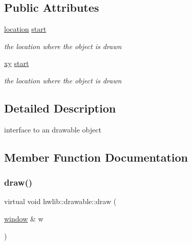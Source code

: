 \subsection*{Public Attributes}
\begin{DoxyCompactItemize}
\item 
\mbox{\label{classhwlib_1_1drawable_a6c31bc9303840a4317d3c95250c357ce}} 
\hyperlink{classhwlib_1_1location}{location} \hyperlink{classhwlib_1_1drawable_a6c31bc9303840a4317d3c95250c357ce}{start}
\begin{DoxyCompactList}\small\item\em the location where the object is drawn \end{DoxyCompactList}\item 
\mbox{\label{classhwlib_1_1drawable_a917eb67b8a33a5ffae2d5d3246943467}} 
\hyperlink{classhwlib_1_1xy}{xy} \hyperlink{classhwlib_1_1drawable_a917eb67b8a33a5ffae2d5d3246943467}{start}
\begin{DoxyCompactList}\small\item\em the location where the object is drawn \end{DoxyCompactList}\end{DoxyCompactItemize}


\subsection{Detailed Description}
interface to an drawable object 

\subsection{Member Function Documentation}
\mbox{\label{classhwlib_1_1drawable_ac9ea0de52a14d9024cb34110f794ac28}} 
\subsubsection{\texorpdfstring{draw()}{draw()}\hspace{0.1cm}{\footnotesize\ttfamily [1/2]}}
{\footnotesize\ttfamily virtual void hwlib\+::drawable\+::draw (\begin{DoxyParamCaption}\item[{\hyperlink{classhwlib_1_1window}{window} \&}]{w }\end{DoxyParamCaption})\hspace{0.3cm}{\ttfamily [pure virtual]}}



